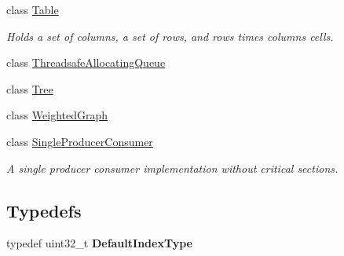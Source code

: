 \begin{DoxyCompactItemize}
\item 
class \hyperlink{class_data_structures_1_1_table}{Table}
\begin{DoxyCompactList}\small\item\em Holds a set of columns, a set of rows, and rows times columns cells. \end{DoxyCompactList}\item 
class \hyperlink{class_data_structures_1_1_threadsafe_allocating_queue}{Threadsafe\-Allocating\-Queue}
\item 
class \hyperlink{class_data_structures_1_1_tree}{Tree}
\item 
class \hyperlink{class_data_structures_1_1_weighted_graph}{Weighted\-Graph}
\item 
class \hyperlink{class_data_structures_1_1_single_producer_consumer}{Single\-Producer\-Consumer}
\begin{DoxyCompactList}\small\item\em A single producer consumer implementation without critical sections. \end{DoxyCompactList}\end{DoxyCompactItemize}
\subsection*{Typedefs}
\begin{DoxyCompactItemize}
\item 
\hypertarget{namespace_data_structures_a976ed408bf7e723e5d6fefb59cf40125}{typedef uint32\-\_\-t {\bfseries Default\-Index\-Type}}\label{namespace_data_structures_a976ed408bf7e723e5d6fefb59cf40125}

\end{DoxyCompactItemize}
